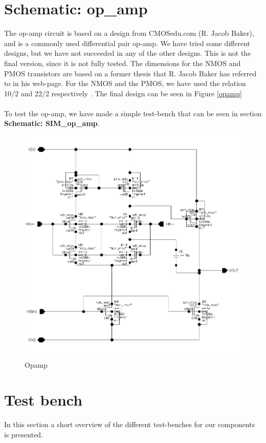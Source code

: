 \documentclass[english, a4paper,11pt]{article}
\begin{document}
\section*{Schematic: op\_amp}
The op-amp circuit is based on a design from CMOSedu.com (R. Jacob Baker), and is a commonly used differential pair op-amp. We have tried some different designs, but we have not succeeded in 
any of the other designs. This is not the final version, since it is not fully tested. The dimensions for the NMOS and PMOS transistors are based on a former thesis that R. Jacob Baker has 
referred to in his web-page. For the NMOS and the PMOS, we have used the relation 10/2 and 22/2 respectively \cite{Saxena}. The final design can be seen in Figure \ref{opamp}\\
\\
To test the op-amp, we have made a simple test-bench that can be seen in section \textbf{Schematic: SIM\_op\_amp}.
\begin{figure}[!ht]
 \centering
   \includegraphics[width=\textwidth]{img/op_amp_3}
   \caption{Opamp}
   \label{op-amp}
\end{figure}


\section{Test bench}
In this section a short overview of the different test-benches for our components is presented.
\end{document}
